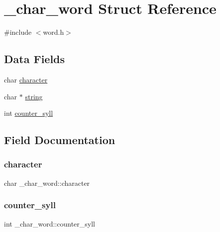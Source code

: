 \hypertarget{struct__char__word}{}\section{\+\_\+char\+\_\+word Struct Reference}
\label{struct__char__word}


{\ttfamily \#include $<$word.\+h$>$}

\subsection*{Data Fields}
\begin{DoxyCompactItemize}
\item 
char \mbox{\hyperlink{struct__char__word_a923893bb982df8732163cb16c78d9a68}{character}}
\item 
char $\ast$ \mbox{\hyperlink{struct__char__word_adaa60c81c7c562ed3e8fee6ec7fa0201}{string}}
\item 
int \mbox{\hyperlink{struct__char__word_a899990c0d69a80beea4155b2f8ff11d7}{counter\+\_\+syll}}
\end{DoxyCompactItemize}


\subsection{Field Documentation}
\mbox{\label{struct__char__word_a923893bb982df8732163cb16c78d9a68}} 
\subsubsection{\texorpdfstring{character}{character}}
{\footnotesize\ttfamily char \+\_\+char\+\_\+word\+::character}

\mbox{\label{struct__char__word_a899990c0d69a80beea4155b2f8ff11d7}} 
\subsubsection{\texorpdfstring{counter\+\_\+syll}{counter\_syll}}
{\footnotesize\ttfamily int \+\_\+char\+\_\+word\+::counter\+\_\+syll}


